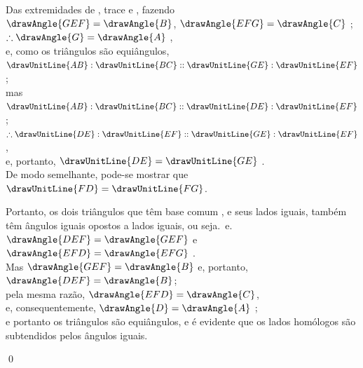 \documentclass[booklanguage=brazilian]{byrnebook}
\begin{document}
\begin{center}
Das extremidades de , trace  e , fazendo\\
$\drawAngle{GEF} = \drawAngle{B}$, $\drawAngle{EFG} = \drawAngle{C}$ ;\\
$\therefore \drawAngle{G} = \drawAngle{A}$ ,\\
e, como os triângulos são equiângulos,\\
$\drawUnitLine{AB} : \drawUnitLine{BC} :: \drawUnitLine{GE} : \drawUnitLine{EF}$ ;\\
mas $\drawUnitLine{AB} : \drawUnitLine{BC} :: \drawUnitLine{DE} : \drawUnitLine{EF}$ \byref{\hypref};\\
$\therefore \drawUnitLine{DE} : \drawUnitLine{EF} :: \drawUnitLine{GE} : \drawUnitLine{EF}$,\\
e, portanto, $\drawUnitLine{DE} = \drawUnitLine{GE}$ .\\
De modo semelhante, pode-se mostrar que\\
$\drawUnitLine{FD} = \drawUnitLine{FG}$.

Portanto, os dois triângulos que têm base comum , e seus lados iguais, também têm ângulos iguais opostos a lados iguais, ou seja.\ e.\\
$\drawAngle{DEF} = \drawAngle{GEF}$ e $\drawAngle{EFD} = \drawAngle{EFG}$ .\\
Mas $\drawAngle{GEF} = \drawAngle{B}$ \byref{\constref} e, portanto, $\drawAngle{DEF} = \drawAngle{B}$;\\
pela mesma razão, $\drawAngle{EFD} = \drawAngle{C}$,\\
e, consequentemente, $\drawAngle{D} = \drawAngle{A}$ ;\\
e portanto os triângulos são equiângulos, e é evidente que os lados homólogos são subtendidos pelos ângulos iguais.
\end{center}

\qed
\end{document}
